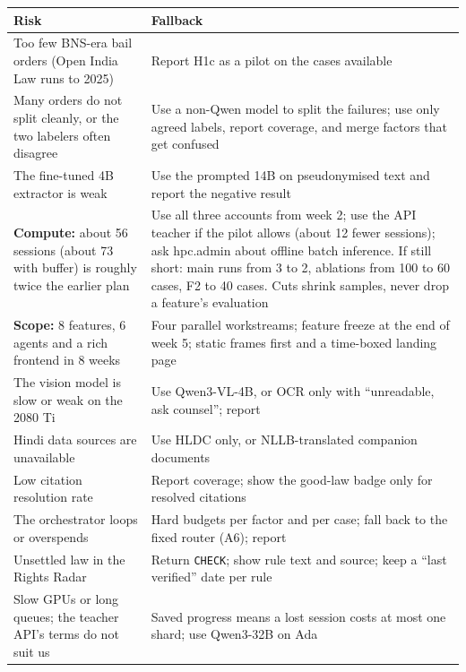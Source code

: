 \documentclass[10pt,a4paper]{article}
\newcommand{\st}[1]{\texttt{\small #1}}
\begin{document}
{\small
\begin{xltabular}{\linewidth}{@{}>{\raggedright\arraybackslash{}\hsize}X>{\raggedright\arraybackslash{}\hsize}X@{}}
\toprule
\textbf{Risk} & \textbf{Fallback} \\
\midrule
\endhead
Too few BNS-era bail orders (Open India Law runs to 2025) & Report H1c as a pilot on the cases available \\
Many orders do not split cleanly, or the two labelers often disagree & Use a non-Qwen model to split the failures; use only agreed labels, report coverage, and merge factors that get confused \\
The fine-tuned 4B extractor is weak & Use the prompted 14B on pseudonymised text and report the negative result \\
\textbf{Compute:} about 56 sessions (about 73 with buffer) is roughly twice the earlier plan & Use all three accounts from week 2; use the API teacher if the pilot allows (about 12 fewer sessions); ask hpc.admin about offline batch inference. If still short: main runs from 3 to 2, ablations from 100 to 60 cases, F2 to 40 cases. Cuts shrink samples, never drop a feature's evaluation \\
\textbf{Scope:} 8 features, 6 agents and a rich frontend in 8 weeks & Four parallel workstreams; feature freeze at the end of week 5; static frames first and a time-boxed landing page \\
The vision model is slow or weak on the 2080 Ti & Use Qwen3-VL-4B, or OCR only with ``unreadable, ask counsel''; report \\
Hindi data sources are unavailable & Use HLDC only, or NLLB-translated companion documents \\
Low citation resolution rate & Report coverage; show the good-law badge only for resolved citations \\
The orchestrator loops or overspends & Hard budgets per factor and per case; fall back to the fixed router (A6); report \\
Unsettled law in the Rights Radar & Return \st{CHECK}; show rule text and source; keep a ``last verified'' date per rule \\
Slow GPUs or long queues; the teacher API's terms do not suit us & Saved progress means a lost session costs at most one shard; use Qwen3-32B on Ada \\
\bottomrule
\end{xltabular}}

\end{document}
